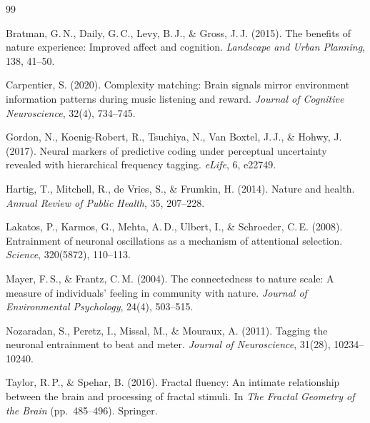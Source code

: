 \documentclass[11pt,a4paper]{article}
\begin{document}
\begin{thebibliography}{99}

Bratman, G.\,N., Daily, G.\,C., Levy, B.\,J., \& Gross, J.\,J. (2015).
The benefits of nature experience: Improved affect and cognition.
\textit{Landscape and Urban Planning}, 138, 41--50.

Carpentier, S. (2020). Complexity matching: Brain signals mirror environment
information patterns during music listening and reward. \textit{Journal of
Cognitive Neuroscience}, 32(4), 734--745.

Gordon, N., Koenig-Robert, R., Tsuchiya, N., Van Boxtel, J.\,J.,
\& Hohwy, J. (2017). Neural markers of predictive coding under perceptual
uncertainty revealed with hierarchical frequency tagging. \textit{eLife},
6, e22749.

Hartig, T., Mitchell, R., de Vries, S., \& Frumkin, H. (2014). Nature and
health. \textit{Annual Review of Public Health}, 35, 207--228.

Lakatos, P., Karmos, G., Mehta, A.\,D., Ulbert, I., \& Schroeder, C.\,E.
(2008). Entrainment of neuronal oscillations as a mechanism of attentional
selection. \textit{Science}, 320(5872), 110--113.

Mayer, F.\,S., \& Frantz, C.\,M. (2004). The connectedness to nature scale:
A measure of individuals' feeling in community with nature. \textit{Journal
of Environmental Psychology}, 24(4), 503--515.

Nozaradan, S., Peretz, I., Missal, M., \& Mouraux, A. (2011). Tagging the
neuronal entrainment to beat and meter. \textit{Journal of Neuroscience},
31(28), 10234--10240.

Taylor, R.\,P., \& Spehar, B. (2016). Fractal fluency: An intimate
relationship between the brain and processing of fractal stimuli.
In \textit{The Fractal Geometry of the Brain} (pp.\ 485--496). Springer.

\end{thebibliography}
\end{document}
